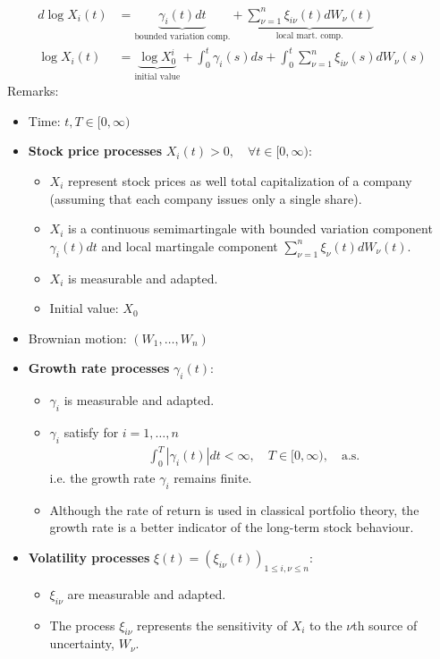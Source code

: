\documentclass[a4paper,landscape,8pt,fleqn]{scrartcl}
\renewcommand{\emph}[1]{\textbf{#1}}
\begin{document}
\begin{multicols*}{3}
\begin{align*}
d\log X_i(t) &= \underbrace{\gamma_i(t) dt}\limits_\text{bounded variation comp.} + \underbrace{\sum_{\nu=1}^n \xi_{i \nu}(t) dW_\nu(t)}\limits_\text{local mart. comp.} \\
\log X_i(t) &= \underbrace{\log X_0^i}\limits_\text{initial value} + \int_0^t \gamma_i(s) ds + \int_0^t \sum_{\nu=1}^n \xi_{i \nu}(s) dW_\nu(s)
\end{align*}
Remarks:
\begin{itemize}
\item Time: $t,T \in [0,\infty)$
\item \emph{Stock price processes} $X_i(t) > 0, \quad \forall t \in [0, \infty)$:
\begin{itemize}
\item $X_i$ represent stock prices as well total capitalization of a company (assuming that each company issues only a single share).
\item $X_i$ is a continuous semimartingale with bounded variation component $\gamma_i(t) dt$ and local martingale component $\sum_{\nu=1}^n \xi_\nu(t) dW_\nu(t)$.
\item $X_i$ is measurable and adapted.
\item Initial value: $X_0$
\end{itemize}
\item Brownian motion: $(W_1, \ldots, W_n)$
\item \emph{Growth rate processes} $\gamma_i(t)$:
\begin{itemize}
\item $\gamma_i$ is measurable and adapted.
\item $\gamma_i$ satisfy for $i = 1,\ldots,n$
\begin{align*}
\int_0^T |\gamma_i(t)| dt < \infty, \quad T \in [0,\infty), \quad \text{a.s.}
\end{align*}
i.e. the growth rate $\gamma_i$ remains finite.
\item Although the rate of return is used in classical portfolio theory, the growth rate is a better indicator of the long-term stock behaviour.
\end{itemize}
\item \emph{Volatility processes} $\xi(t) = (\xi_{i \nu}(t))_{1 \leq i, \nu \leq n}$:
\begin{itemize}
\item $\xi_{i\nu}$ are measurable and adapted.
\item The process $\xi_{i \nu}$ represents the sensitivity of $X_i$ to the $\nu$th source of uncertainty, $W_\nu$.

\end{itemize}
\end{itemize}
\end{multicols*}
\end{document}

